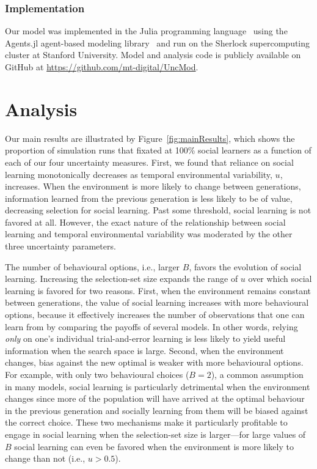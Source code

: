 \documentclass[letterpaper,11.5pt]{scrartcl}
\begin{document}
\subsubsection{Implementation}

Our model was implemented in the Julia programming language~\citep{Bezanson2017} 
using the Agents.jl agent-based modeling library~\citep{Datseris2022} and run
on the Sherlock supercomputing cluster at Stanford University. Model and analysis code is publicly available on GitHub at \url{https://github.com/mt-digital/UncMod}.


\section{Analysis}

Our main results are illustrated by Figure~\ref{fig:mainResults}, which shows the
proportion of simulation runs that fixated at 100\% social learners as a function of
each of our four uncertainty measures. First, we found that reliance on social
learning monotonically decreases as temporal environmental variability, $u$,
increases. When the environment is more likely to change between generations,
information learned from the previous generation is less likely to be of value,
decreasing selection for social learning. Past some threshold, social learning is
not favored at all. However, the exact nature of the relationship between social
learning and temporal environmental variability was moderated by the other three uncertainty parameters. 

The number of behavioural options, i.e., larger $B$, favors the evolution of social learning. Increasing the selection-set size
expands the range of $u$ over which social learning is favored for two reasons. First, when the environment remains constant between
generations, the value of social learning increases with more behavioural options, because it effectively increases the number of
observations that one can learn from by comparing the payoffs of several models. In other words, relying \emph{only} on one's
individual trial-and-error learning is less likely to yield useful information when the search space is large. Second, when the environment changes, bias against the new optimal is weaker with more behavioural options. For example, with only two behavioural choices ($B = 2$), a common assumption in many models, social learning is particularly detrimental when the environment changes since more of the population will have arrived at the optimal behaviour in the previous generation and socially learning from them will be biased against the correct choice. These two mechanisms make it particularly profitable to engage in social learning when the selection-set size is larger---for large values of $B$ social learning can even be favored when the environment is more likely to change than not (i.e., $u>0.5$). 
\end{document}
